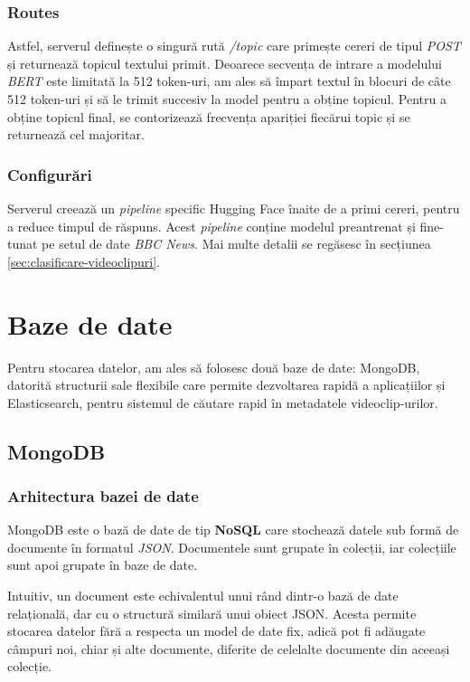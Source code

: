\subsubsection{Routes}
\par
Astfel, serverul definește o singură rută \textit{/topic} care primește cereri de tipul \textit{POST}
și returnează topicul textului primit. Deoarece secvența de intrare a modelului \textit{BERT} este 
limitată la 512 token-uri, am ales să împart textul în blocuri de câte 512 token-uri și să le trimit
succesiv la model pentru a obține topicul. Pentru a obține topicul final, se contorizează frecvența
apariției fiecărui topic și se returnează cel majoritar.
\subsubsection{Configurări}
\par
Serverul creează un \textit{pipeline} specific Hugging Face înaite de a primi cereri, pentru a reduce
timpul de răspuns. Acest \textit{pipeline} conține modelul preantrenat și fine-tunat pe setul de date
\textit{BBC News}. Mai multe detalii se regăsesc în secțiunea \ref{sec:clasificare-videoclipuri}.

\section{Baze de date}
Pentru stocarea datelor, am ales să folosesc două baze de date: MongoDB, datorită structurii sale
flexibile care permite dezvoltarea rapidă a aplicațiilor și Elasticsearch, pentru sistemul de căutare
rapid în metadatele videoclip-urilor.
\subsection{MongoDB}
\subsubsection{Arhitectura bazei de date}
MongoDB este o bază de date de tip \textbf{NoSQL} care stochează datele sub formă de documente în 
formatul \textit{JSON}. Documentele sunt grupate în colecții, iar colecțiile sunt apoi grupate în
baze de date. 
\par
Intuitiv, un document este echivalentul unui rând dintr-o bază de date relațională, dar cu o structură
similară unui obiect JSON. Acesta permite stocarea datelor fără a respecta un model de date fix, adică
pot fi adăugate câmpuri noi, chiar și alte documente, diferite de celelalte documente din aceeași colecție.


